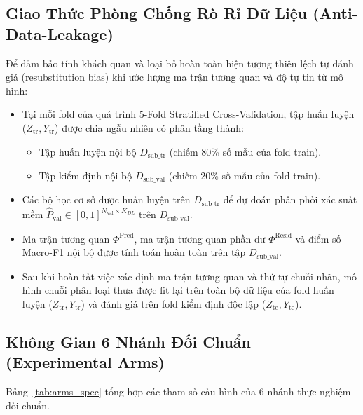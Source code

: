 \documentclass[11pt,a4paper]{article}
\begin{document}
\subsection{Giao Thức Phòng Chống Rò Rỉ Dữ Liệu (Anti-Data-Leakage)}
Để đảm bảo tính khách quan và loại bỏ hoàn toàn hiện tượng thiên lệch tự đánh giá (resubstitution bias) khi ước lượng ma trận tương quan và độ tự tin từ mô hình:
\begin{itemize}[leftmargin=*]
  \item Tại mỗi fold của quá trình 5-Fold Stratified Cross-Validation, tập huấn luyện ($Z_{\text{tr}}, Y_{\text{tr}}$) được chia ngẫu nhiên có phân tầng thành:
  \begin{itemize}
    \item Tập huấn luyện nội bộ $D_{\text{sub\_tr}}$ (chiếm 80\% số mẫu của fold train).
    \item Tập kiểm định nội bộ $D_{\text{sub\_val}}$ (chiếm 20\% số mẫu của fold train).
  \end{itemize}
  \item Các bộ học cơ sở được huấn luyện trên $D_{\text{sub\_tr}}$ để dự đoán phân phối xác suất mềm $\hat{P}_{\text{val}} \in [0, 1]^{N_{\text{val}} \times K_{DL}}$ trên $D_{\text{sub\_val}}$.
  \item Ma trận tương quan $\Phi^{\text{Pred}}$, ma trận tương quan phần dư $\Phi^{\text{Resid}}$ và điểm số Macro-F1 nội bộ được tính toán hoàn toàn trên tập $D_{\text{sub\_val}}$.
  \item Sau khi hoàn tất việc xác định ma trận tương quan và thứ tự chuỗi nhãn, mô hình chuỗi phân loại thưa được fit lại trên toàn bộ dữ liệu của fold huấn luyện ($Z_{\text{tr}}, Y_{\text{tr}}$) và đánh giá trên fold kiểm định độc lập ($Z_{\text{te}}, Y_{\text{te}}$).
\end{itemize}

\subsection{Không Gian 6 Nhánh Đối Chuẩn (Experimental Arms)}

Bảng~\ref{tab:arms_spec} tổng hợp các tham số cấu hình của 6 nhánh thực nghiệm đối chuẩn.
\end{document}
